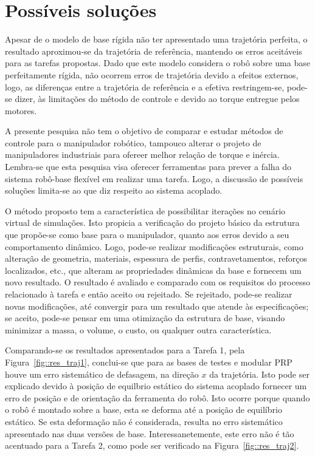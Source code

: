 \section{Possíveis soluções} \label{sec::solucoes}

Apesar de o modelo de base rígida não ter apresentado uma trajetória perfeita, o
resultado aproximou-se da trajetória de referência, mantendo os erros aceitáveis
para as tarefas propostas. Dado que este modelo considera o robô sobre uma base
perfeitamente rígida, não ocorrem erros de trajetória devido a efeitos externos,
logo, as diferenças entre a trajetória de referência e a efetiva restringem-se,
pode-se dizer, às limitações do método de controle e devido ao torque entregue
pelos motores.

A presente pesquisa não tem o objetivo de comparar e estudar métodos de controle
para o manipulador robótico, tampouco alterar o projeto de manipuladores
industriais para ofereer melhor relação de torque e inércia. Lembra-se que esta
pesquisa visa oferecer ferramentas para prever a falha do sistema robô-base
flexível em realizar uma tarefa. Logo, a discussão de possíveis soluções
limita-se ao que diz respeito ao sistema acoplado. 

O método proposto tem a característica de possibilitar iterações no cenário
virtual de simulações. Isto propicia a verificação do projeto básico da
estrutura que propõe-se como base para o manipulador, quanto aos erros devido a
seu comportamento dinâmico. Logo, pode-se realizar modificações estruturais,
como alteração de geometria, materiais, espessura de perfis, contravetamentos,
reforços localizados, etc., que alteram as propriedades dinâmicas da base e
fornecem um novo resultado. O resultado é avaliado e comparado com os requisitos
do processo relacionado à tarefa e então aceito ou rejeitado. Se rejeitado,
pode-se realizar novas modificações, até convergir para um resultado que atende
às especificações; se aceito, pode-se pensar em uma otimização da estrutura de
base, visando minimizar a massa, o volume, o custo, ou qualquer outra
característica.

Comparando-se os resultados apresentados para a Tarefa 1, pela
Figura~\ref{fig::res_traj1}, conclui-se que para as bases de testes e modular
PRP houve um erro sistemático de defasagem, na direção $x$ da trajetória. Isto
pode ser explicado devido à posição de equilbrio estático do sistema acoplado
fornecer um erro de posição e de orientação da ferramenta do robô. Isto ocorre
porque quando o robô é montado sobre a base, esta se deforma até a posição de
equilíbrio estático. Se esta deformação não é considerada, resulta no erro
sistemático apresentado nas duas versões de base. Interessanetemente, este erro
não é tão acentuado para a Tarefa 2, como pode ser verificado na
Figura~\ref{fig::res_traj2}.


